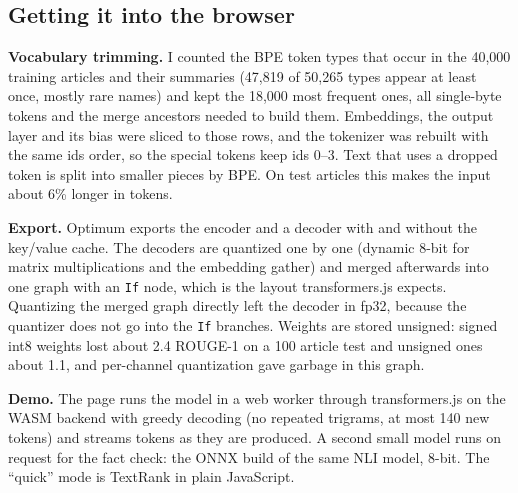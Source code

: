 \documentclass[11pt,a4paper]{article}
\begin{document}
\subsection{Getting it into the browser}
\label{sec:trim}

\textbf{Vocabulary trimming.} I counted the BPE token types that occur in the 40,000 training articles and
their summaries (47,819 of 50,265 types appear at least once, mostly rare names) and kept the 18,000 most
frequent ones, all single-byte tokens and the merge ancestors needed to build them. Embeddings, the output
layer and its bias were sliced to those rows, and the tokenizer was rebuilt with the same ids order, so the
special tokens keep ids 0--3. Text that uses a dropped token is split into smaller pieces by BPE. On
test articles this makes the input about 6\% longer in tokens.

\textbf{Export.} Optimum exports the encoder and a decoder with and without the key/value cache. The decoders are
quantized one by one (dynamic 8-bit for matrix multiplications and the embedding gather) and merged
afterwards into one graph with an \texttt{If} node, which is the layout transformers.js expects. Quantizing the
merged graph directly left the decoder in fp32, because the quantizer does not go into the \texttt{If}
branches. Weights are stored unsigned: signed int8 weights lost about 2.4 ROUGE-1 on a 100 article test
and unsigned ones about 1.1, and per-channel quantization gave garbage in this graph.

\textbf{Demo.} The page runs the model in a web worker through transformers.js on the WASM backend with greedy
decoding (no repeated trigrams, at most 140 new tokens) and streams tokens as they are produced. A second small
model runs on request for the fact check: the ONNX build of the same NLI model, 8-bit. The ``quick'' mode is
TextRank in plain JavaScript.
\end{document}
